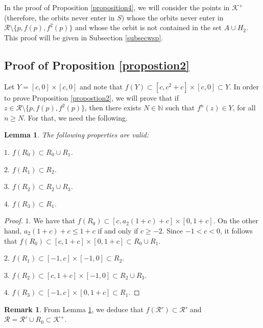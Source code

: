 \documentclass[11pt]{amsart}
\newtheorem{lemma}[theorem]{Lemma}
\theoremstyle{definition}
\newtheorem{remark}{Remark}
\begin{document}
In the proof of Proposition \ref{proposition4}, we will consider the points in $\mathcal{K}^+$ (therefore, the orbits never enter in $S$) whose the orbits never enter in $\mathcal{R}\setminus \{p,f(p),f^2(p)\}$ and whose the orbit is not contained in the set $A\cup H_2$. This proof will be given in Subsection \ref{subsecwsp}.

\subsection{Proof of Proposition \ref{propostion2}} \label{subsecr0r1r2r3}
Let $Y=[c,0]\times[c,0]$ and note that $f(Y)\subset [c,c^2+c]\times[c,0]\subset Y$. In order to prove Proposition \ref{propostion2}, we will prove that if $z\in\mathcal{R}\setminus\{p,f(p),f^2(p)\}$, then there exists $N\in\mathbb{N}$ such that $f^n(z)\in Y$,  for all $n\geq N$.
For that, we need the following.

\begin{lemma}
	The following properties are valid:
	
	\noindent $1.$ $f(R_0)\subset R_0\cup R_1$.
	
	\noindent $2.$ $f(R_1)\subset R_2$.
	
	\noindent $3.$  $f(R_2)\subset R_2\cup R_3$.
	
	\noindent $4.$ $f(R_3)\subset R_1$. \label{lema3}
\end{lemma}
\begin{proof} $1.$ We have that $f(R_0)\subset [c,a_2(1+c)+c]\times [0,1+c]$. On the other hand, $a_2(1+c)+c\leq 1+c$ if and only if $c\geq-2$. Since $-1<c<0$, it follows that $f(R_0)\subset [c,1+c]\times[0,1+c]\subset R_0\cup R_1$.
	
	\noindent $2.$ $f(R_1)\subset [-1,c]\times [-1,0]\subset R_2$.
	
	\noindent $3.$ $f(R_2)\subset [c,1+c]\times[-1,0]\subset R_2\cup R_3$.
	
	\noindent $4.$ $f(R_3)\subset [-1,c]\times[0,1+c]\subset R_1$.
\end{proof}

\begin{remark} \label{obsrlinha} 
From Lemma \ref{lema3}, we deduce that $f(\mathcal{R}')\subset \mathcal{R}'$ and $\mathcal{R}=\mathcal{R}'\cup R_0\subset \mathcal{K}^+$.
\end{remark}
\end{document}
